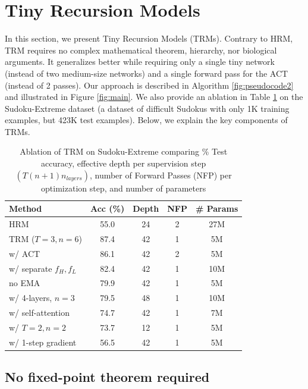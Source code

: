 \documentclass{article}
\newcounter{col}
\theoremstyle{plain}
\theoremstyle{definition}
\theoremstyle{remark}
\begin{document}
\section{Tiny Recursion Models}

In this section, we present Tiny Recursion Models (TRMs). Contrary to HRM, TRM requires no complex mathematical theorem, hierarchy, nor biological arguments. It generalizes better while requiring only a single tiny network (instead of two medium-size networks) and a single forward pass for the ACT (instead of 2 passes). Our approach is described in Algorithm \ref{fig:pseudocode2} and illustrated in Figure \ref{fig:main}. We also provide an ablation in Table \ref{tab:ablation} on the Sudoku-Extreme dataset (a dataset of difficult Sudokus with only 1K training examples, but 423K test examples). Below, we explain the key components of TRMs. 

\setlength{\tabcolsep}{2pt} %
\begin{table}[h]
    \caption{Ablation of TRM on Sudoku-Extreme comparing \% Test accuracy, effective depth per supervision step $(T(n+1)n_{layers})$, number of Forward Passes (NFP) per optimization step, and number of parameters}
    \centering
    \begin{tabular}{|l|c|c|c|c|}
    \hline
     Method & Acc (\%) & Depth & NFP & \# Params \\
    \hline
HRM & 55.0 & 24 & 2 & 27M \\
\hline
TRM ($T=3, n=6$) & 87.4 & 42 & 1 & 5M \\
w/ ACT & 86.1 & 42 & 2 & 5M \\
w/ separate $f_H, f_L$ & 82.4 & 42 & 1 & 10M \\
no EMA & 79.9 & 42 & 1 & 5M \\
w/ 4-layers, $n=3$  & 79.5 & 48 & 1 & 10M \\
w/ self-attention & 74.7 & 42 & 1 & 7M \\
w/ $T=2, n=2$ & 73.7 & 12 & 1 & 5M \\
w/ 1-step gradient & 56.5 & 42 & 1 & 5M \\
\hline
\end{tabular}
\label{tab:ablation}
\end{table}
\setlength{\tabcolsep}{6pt} %

\subsection{No fixed-point theorem required}
\end{document}
